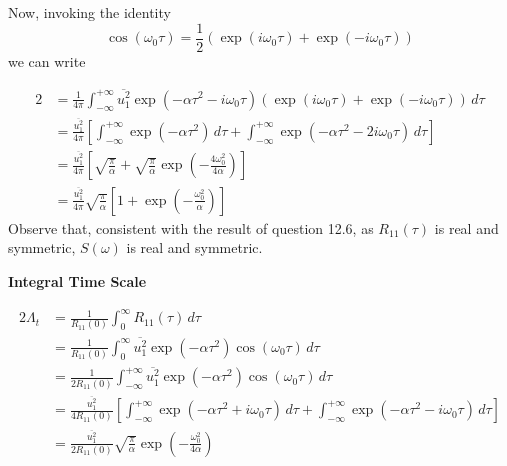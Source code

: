 \documentclass[a4paper]{article}
\begin{document}
Now, invoking the identity
\[
	\cos\left( \omega_{0}\tau  \right) = \frac{1}{2} \!\left( \exp\left( i \omega_{0}\tau  \right) + \exp\left( -i \omega_{0} \tau  \right) \right) 
\]
we can write

\begin{alignat*}{2}
	 & = \frac{1}{4 \pi } \int^{+\infty}_{-\infty} \overline{u^{2}_{1}} \exp\left( -\alpha \tau^{2} - i \omega_{0} \tau  \right) \!\left( \exp\left( i \omega_{0}\tau  \right) + \exp\left( -i \omega_{0}\tau  \right) \right)  \, d \tau  \\
	 & = \frac{\overline{u^{2}_{1}}}{4 \pi } \!\left[ \int^{+\infty}_{-\infty} \exp\left( -\alpha \tau^{2} \right) \, d \tau + \int^{+\infty}_{-\infty} \exp\left( -\alpha \tau^{2} - 2i \omega_{0}\tau  \right) \, d \tau \right]  \\ 
	 & = \frac{\overline{u^{2}_{1}}}{4 \pi } \!\left[ \sqrt{\frac{\pi }{\alpha }} + \sqrt{\frac{\pi }{\alpha }} \exp\left( -\frac{4 \omega^{2}_{0}}{4 \alpha } \right)  \right] \\
	 & = \boxed{ \frac{\overline{u^{2}_{1}}}{4 \pi } \sqrt{\frac{\pi }{\alpha }} \!\left[ 1 + \exp\left( -\frac{\omega^{2}_{0}}{\alpha} \right) \right] } 
\end{alignat*}
Observe that, consistent with the result of question 12.6, as \(R_{11}\!\left( \tau  \right) \) is real and symmetric, \(S \!\left( \omega  \right) \) is real and symmetric.

\vspace{12pt}

\textbf{Integral Time Scale}

\begin{alignat*}{2}
	\Lambda_{t} & = \frac{1}{R_{11} \!\left( 0 \right) } \int^{\infty}_{0} R_{11}\!\left( \tau  \right)  \, d \tau   \\
	 & = \frac{1}{R_{11} \!\left( 0 \right) } \int^{\infty}_{0} \overline{u^{2}_{1}}\exp\left( -\alpha \tau^{2} \right) \cos\left( \omega_{0}\tau  \right) \, d \tau  \\ 
	 & = \frac{1}{2 R_{11}\!\left( 0 \right) } \int^{+\infty}_{-\infty} \overline{u^{2}_{1}}\exp\left( -\alpha \tau^{2} \right)\cos\left( \omega_{0}\tau  \right) \, d \tau \\ 
	 & = \frac{\overline{u^{2}_{1}}}{4 R_{11}\!\left( 0 \right) } \!\left[ \int^{+\infty}_{-\infty} \exp\left( -\alpha \tau^{2} + i \omega_{0} \tau  \right)  \, d \tau + \int^{+\infty}_{-\infty} \exp\left( -\alpha \tau^{2} - i \omega_{0} \tau  \right) \, d \tau \right] \\
	 & = \frac{\overline{u^{2}_{1}}}{2 R_{11}\!\left( 0 \right) } \sqrt{\frac{\pi }{\alpha }} \exp\left( -\frac{\omega^{2}_{0}}{4 \alpha } \right) \\
\end{alignat*}
\end{document}
